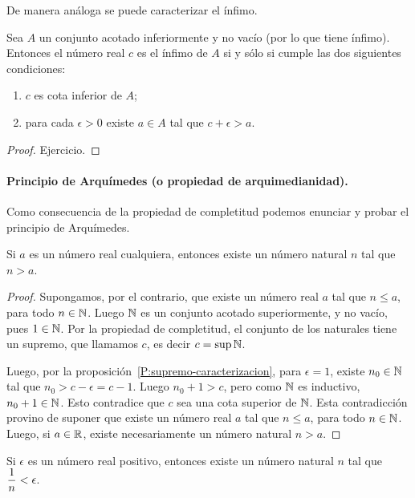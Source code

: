 De manera análoga se puede caracterizar el ínfimo.

\begin{proposition}\label{P:infimo-caracterizacion}
    Sea $A$ un conjunto acotado inferiormente y no vacío (por lo que tiene ínfimo).
    Entonces el número real $c$ es el ínfimo de $A$ si y sólo si cumple las dos siguientes condiciones:
    \begin{enumerate}[{\rm(i)}]
        \item $c$ es cota inferior de $A$;
        \item para cada $\epsilon >0$ existe $a\in A$ tal que $c+\epsilon > a$.
    \end{enumerate}
\end{proposition}

\begin{proof}
    Ejercicio.
\end{proof}

\paragraph{Principio de Arquímedes (o propiedad de arquimedianidad).} Como consecuencia de la propiedad de completitud podemos enunciar y probar el principio de Arquímedes.

\begin{proposition}
    Si $a$ es un número real cualquiera, entonces existe un número natural $n$ tal que $n>a$.
\end{proposition}

\begin{proof}
    Supongamos, por el contrario, que existe un número real $a$ tal que $n \le a$, para todo $n \in \mathbb{N}$.
    Luego $\mathbb{N}$ es un conjunto acotado superiormente, y no vacío, pues $1\in \mathbb{N}$. Por la propiedad de completitud, el conjunto de los naturales tiene un supremo, que llamamos $c$, es decir $c = \sup \mathbb{N}$.

    Luego, por la proposición~\ref{P:supremo-caracterizacion}, para $\epsilon = 1$, existe $n_0 \in \mathbb{N}$ tal que $n_0 > c-\epsilon = c-1$. Luego $n_0 + 1 > c$, pero como $\mathbb{N}$ es inductivo, $n_0+1\in\mathbb{N}$. Esto contradice que $c$ sea una cota superior de $\mathbb{N}$. Esta contradicción provino de suponer que existe un número real $a$ tal que $n \le a$, para todo $n \in \mathbb{N}$.
    Luego, si $a\in\mathbb{R}$, existe necesariamente un número natural $n>a$.
\end{proof}

\begin{corollary}\label{1sobrenmenorqueeps}
    Si $\epsilon$ es un número real positivo, entonces existe un número natural $n$ tal que $\displaystyle\frac1n < \epsilon$.
\end{corollary}

